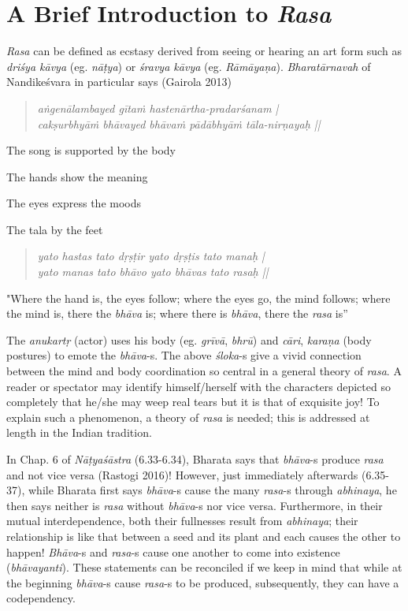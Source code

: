 \section{A Brief Introduction to \textsl{Rasa}}\label{chap3-sec2}

\textsl{Rasa} can be defined as ecstasy derived from seeing or hearing an art form such as \textsl{driśya kāvya} (eg. \textsl{nāṭya}) or \textsl{śravya kāvya} (eg. \textsl{Rāmāyaṇa}). \textsl{Bharatārnavah} of Nandikeśvara in particular says (Gairola 2013)

\begin{quote}
\textsl{aṅgenālambayed gītaṁ hastenārtha-pradarśanam |}\\
\textsl{cakṣurbhyāṁ bhāvayed bhāvaṁ pādābhyāṁ tāla-nirṇayaḥ ||}
\end{quote}

The song is supported by the body

The hands show the meaning

The eyes express the moods

The tala by the feet
\begin{quote}
\textsl{yato hastas tato dṛṣṭir yato dṛṣṭis tato manaḥ |}\\
\textsl{yato manas tato bhāvo yato bhāvas tato rasaḥ ||}
\end{quote}

"Where the hand is, the eyes follow; where the eyes go, the mind follows; where the mind is, there the \textsl{bhāva} is; where there is \textsl{bhāva}, there the \textsl{rasa} is”

The \textsl{anukartṛ} (actor) uses his body (eg. \textsl{grīvā}, \textsl{bhrū}) and \textsl{cāri}, \textsl{karaṇa} (body postures) to emote the \textsl{bhāva}-s. The above \textsl{śloka}-s give a vivid connection between the mind and body coordination so central in a general theory of \textsl{rasa}. A reader or spectator may identify himself/herself with the characters depicted so completely that he/she may weep real tears but it is that of exquisite joy! To explain such a phenomenon, a theory of \textsl{rasa} is needed; this is addressed at length in the Indian tradition. 

In Chap. 6 of \textsl{Nāṭyaśāstra} (6.33-6.34), Bharata says that \textsl{bhāva}-s produce \textsl{rasa} and not vice versa (Rastogi 2016)! However, just immediately afterwards (6.35-37), while Bharata first says \textsl{bhāva}-s cause the many \textsl{rasa}-s through \textsl{abhinaya}, he then says neither is \textsl{rasa} without \textsl{bhāva}-s nor vice versa. Furthermore, in their mutual interdependence, both their fullnesses result from \textsl{abhinaya}; their relationship is like that between a seed and its plant and each causes the other to happen! \textsl{Bhāva}-s and \textsl{rasa}-s cause one another to come into existence (\textsl{bhāvayanti}). These statements can be reconciled if we keep in mind that while at the beginning \textsl{bhāva}-s cause \textsl{rasa}-s to be produced, subsequently, they can have a codependency.


